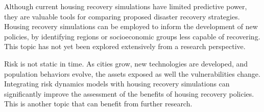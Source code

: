 Although current housing recovery simulations have limited predictive power, they are valuable tools for comparing proposed disaster recovery strategies. Housing recovery simulations can be employed to inform the development of new policies, by identifying regions or socioeconomic groups less capable of recovering. This topic has not yet been explored extensively from a research perspective.\ 

Risk is not static in time. As cities grow, new technologies are developed, and population behaviors evolve, the assets exposed as well the vulnerabilities change. Integrating risk dynamics models with housing recovery simulations can significantly improve the assessment of the benefits of housing recovery policies. This is another topic that can benefit from further research.\





